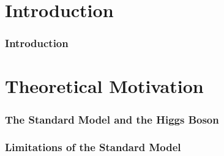 \documentclass[NOTE, atlasdraft=true, texlive=2016, UKenglish]{\ATLASLATEXPATH atlasdoc}
\begin{document}
\maketitle

\tableofcontents

\clearpage

\part{Introduction}
\label{part:intro}


\section{Introduction}
\label{sec:intro}




\part{Theoretical Motivation}
\label{part:theory}


\section{The Standard Model and the Higgs Boson}
\label{sec:sm}



\section{Limitations of the Standard Model}
\label{sec:smProblems}

\end{document}
